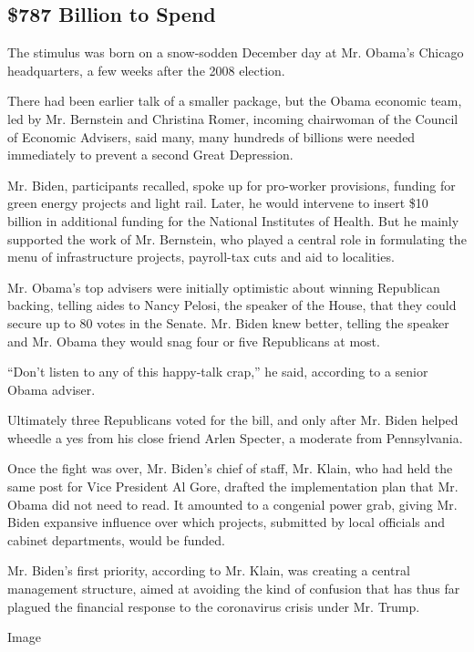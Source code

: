 \hypertarget{787-billion-to-spend}{%
\subsection{\$787 Billion to Spend}\label{787-billion-to-spend}}

The stimulus was born on a snow-sodden December day at Mr. Obama's
Chicago headquarters, a few weeks after the 2008 election.

There had been earlier talk of a smaller package, but the Obama economic
team, led by Mr. Bernstein and Christina Romer, incoming chairwoman of
the Council of Economic Advisers, said many, many hundreds of billions
were needed immediately to prevent a second Great Depression.

Mr. Biden, participants recalled, spoke up for pro-worker provisions,
funding for green energy projects and light rail. Later, he would
intervene to insert \$10 billion in additional funding for the National
Institutes of Health. But he mainly supported the work of Mr. Bernstein,
who played a central role in formulating the menu of infrastructure
projects, payroll-tax cuts and aid to localities.

Mr. Obama's top advisers were initially optimistic about winning
Republican backing, telling aides to Nancy Pelosi, the speaker of the
House, that they could secure up to 80 votes in the Senate. Mr. Biden
knew better, telling the speaker and Mr. Obama they would snag four or
five Republicans at most.

``Don't listen to any of this happy-talk crap,'' he said, according to a
senior Obama adviser.

Ultimately three Republicans voted for the bill, and only after Mr.
Biden helped wheedle a yes from his close friend Arlen Specter, a
moderate from Pennsylvania.

Once the fight was over, Mr. Biden's chief of staff, Mr. Klain, who had
held the same post for Vice President Al Gore, drafted the
implementation plan that Mr. Obama did not need to read. It amounted to
a congenial power grab, giving Mr. Biden expansive influence over which
projects, submitted by local officials and cabinet departments, would be
funded.

Mr. Biden's first priority, according to Mr. Klain, was creating a
central management structure, aimed at avoiding the kind of confusion
that has thus far plagued the financial response to the coronavirus
crisis under Mr. Trump.

Image

